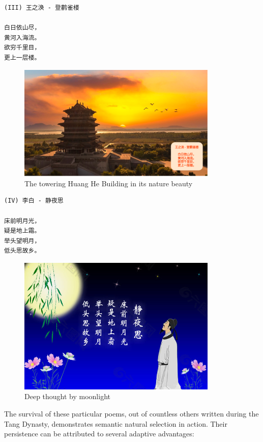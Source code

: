 \documentclass[
  11pt,
  letterpaper,
]{article}
\begin{document}
\begin{verbatim}
(III) 王之涣 - 登鹳雀楼

白日依山尽，
黄河入海流。
欲穷千里目，
更上一层楼。
\end{verbatim}

\begin{figure}
\centering
\includegraphics[width=0.85\textwidth]{./images/poem_huang-he-lou.png}
\caption{The towering Huang He Building in its nature beauty}
\end{figure}

\begin{verbatim}
(IV) 李白 - 静夜思

床前明月光，
疑是地上霜。
举头望明月，
低头思故乡。
\end{verbatim}

\begin{figure}
\centering
\includegraphics[width=0.85\textwidth]{./images/poem_moonlight.jpg}
\caption{Deep thought by moonlight}
\end{figure}

The survival of these particular poems, out of countless others written
during the Tang Dynasty, demonstrates semantic natural selection in
action. Their persistence can be attributed to several adaptive
advantages:
\end{document}
